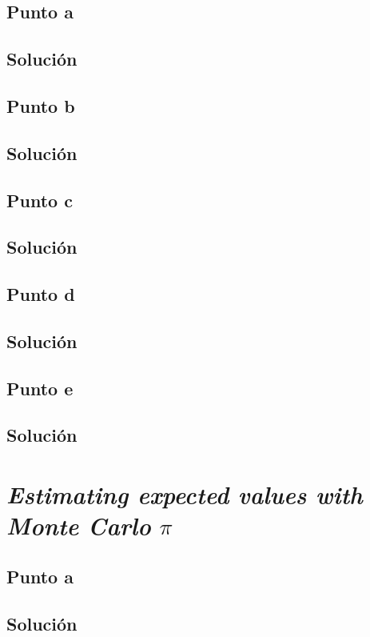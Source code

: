 \documentclass[12pt]{article}
\begin{document}
\subsection{Punto a}
\subsection{Solución}

\subsection{Punto b}
\subsection{Solución}

\subsection{Punto c}
\subsection{Solución}

\subsection{Punto d}
\subsection{Solución}

\subsection{Punto e}
\subsection{Solución}



\section{\textit{Estimating expected values with Monte Carlo} \(\pi\)}

\subsection{Punto a}
\subsection{Solución}
\end{document}
